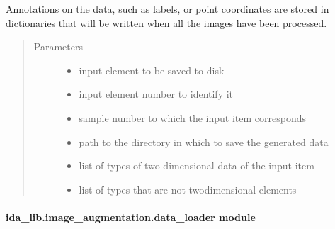 \documentclass[letterpaper,10pt,english]{sphinxmanual}
\begin{document}
\begin{fulllineitems}
\begin{fulllineitems}
\begin{itemize}
\end{itemize}

Annotations on the data, such as labels, or point coordinates are stored in dictionaries that will be written
when all  the images have been processed.
\begin{quote}\begin{description}
\item[{Parameters}] \leavevmode\begin{itemize}
\item {} 
 \textendash{} input element to be saved to disk

\item {} 
 \textendash{} input element number to identify it

\item {} 
 \textendash{} sample number to which the input item corresponds

\item {} 
 \textendash{} path to the directory in which to save the generated data

\item {} 
 \textendash{} list of types of two dimensional data of the input item

\item {} 
 \textendash{} list of types that are not two\sphinxhyphen{}dimensional elements

\end{itemize}

\end{description}\end{quote}

\end{fulllineitems}


\end{fulllineitems}



\paragraph{ida\_lib.image\_augmentation.data\_loader module}
\label{\detokenize{ida_lib.image_augmentation:module-ida_lib.image_augmentation.data_loader}}\label{\detokenize{ida_lib.image_augmentation:ida-lib-image-augmentation-data-loader-module}}
\end{document}
